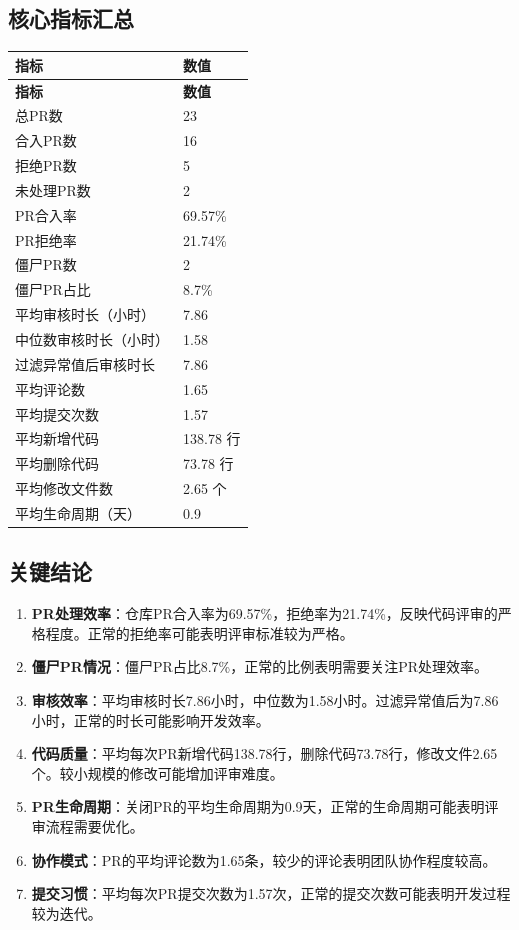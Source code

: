 \subsection*{核心指标汇总}
\begin{longtable}{l|l}
\hline
\textbf{指标} & \textbf{数值} \\
\hline
\endfirsthead
\hline
\textbf{指标} & \textbf{数值} \\
\hline
\endhead
\hline
\endfoot
总PR数 & 23 \\
合入PR数 & 16 \\
拒绝PR数 & 5 \\
未处理PR数 & 2 \\
PR合入率 & 69.57\% \\
PR拒绝率 & 21.74\% \\
僵尸PR数 & 2 \\
僵尸PR占比 & 8.7\% \\
平均审核时长（小时） & 7.86 \\
中位数审核时长（小时） & 1.58 \\
过滤异常值后审核时长 & 7.86 \\
平均评论数 & 1.65 \\
平均提交次数 & 1.57 \\
平均新增代码 & 138.78 行 \\
平均删除代码 & 73.78 行 \\
平均修改文件数 & 2.65 个 \\
平均生命周期（天） & 0.9 \\
\hline
\end{longtable}

\subsection*{关键结论}

\begin{enumerate}
    \item \textbf{PR处理效率}：仓库PR合入率为69.57\%，拒绝率为21.74\%，反映代码评审的严格程度。正常的拒绝率可能表明评审标准较为严格。
    \item \textbf{僵尸PR情况}：僵尸PR占比8.7\%，正常的比例表明需要关注PR处理效率。
    \item \textbf{审核效率}：平均审核时长7.86小时，中位数为1.58小时。过滤异常值后为7.86小时，正常的时长可能影响开发效率。
    \item \textbf{代码质量}：平均每次PR新增代码138.78行，删除代码73.78行，修改文件2.65个。较小规模的修改可能增加评审难度。
    \item \textbf{PR生命周期}：关闭PR的平均生命周期为0.9天，正常的生命周期可能表明评审流程需要优化。
    \item \textbf{协作模式}：PR的平均评论数为1.65条，较少的评论表明团队协作程度较高。
    \item \textbf{提交习惯}：平均每次PR提交次数为1.57次，正常的提交次数可能表明开发过程较为迭代。
\end{enumerate}

